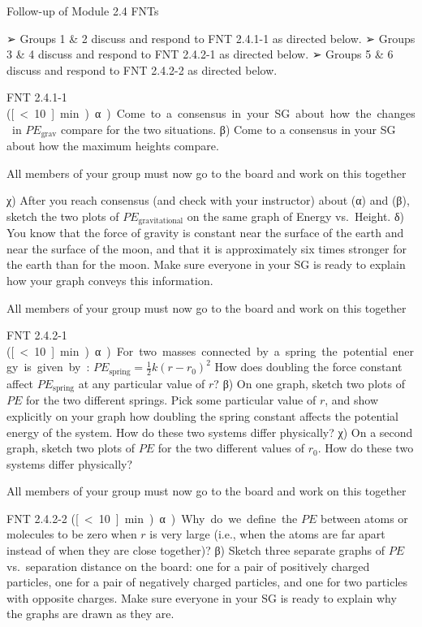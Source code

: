
Follow-up of Module 2.4 FNTs

➢	Groups 1 \& 2 discuss and respond to FNT 2.4.1-1 as directed below. 
➢	Groups 3 \& 4 discuss and respond to FNT 2.4.2-1 as directed below. 
➢	Groups 5 \& 6 discuss and respond to FNT 2.4.2-2 as directed below. 

FNT 2.4.1-1 (\unit[\textless10]{min})  
α)	Come to a consensus in your SG about how the changes in $PE_\text{grav}$ compare for the two situations. 
β)	Come to a consensus in your SG about how the maximum heights compare. 

All members of your group must now go to the board and work on this together 

χ)	After you reach consensus (and check with your instructor) about (α) and (β), sketch the two plots of $PE_\text{gravitational}$ on the same graph of Energy vs.\ Height.  
δ)	You know that the force of gravity is constant near the surface of the earth and near the surface of the moon, and that it is approximately six times stronger for the earth than for the moon.  Make sure everyone in your SG is ready to explain how your graph conveys this information.  


All members of your group must now go to the board and work on this together 

FNT 2.4.2-1 (\unit[\textless10]{min})  
α)	For two masses connected by a spring the potential energy is given by: 
$PE_\text{spring} = \frac{1}{2} k(r-r_0)^2$
How does doubling the force constant affect $PE_\text{spring}$ at any particular value of $r$? 
β)	On one graph, sketch two plots of $PE$ for the two different springs. Pick some particular value of $r$, and show explicitly on your graph how doubling the spring constant affects the potential energy of the system. How do these two systems differ physically?
χ)	On a second graph, sketch two plots of $PE$ for the two different values of $r_0$. How do these two systems differ physically?  

All members of your group must now go to the board and work on this together 

FNT 2.4.2-2 (\unit[\textless10]{min})  
α)	Why do we define the $PE$ between atoms or molecules to be zero when $r$ is very large (i.e., when the atoms are far apart instead of when they are close together)? 
β)	Sketch three separate graphs of $PE$ vs.\ separation distance on the board: one for a pair of positively charged particles, one for a pair of negatively charged particles, and one for two particles with opposite charges. Make sure everyone in your SG is ready to explain why the graphs are drawn as they are.


\WCD
